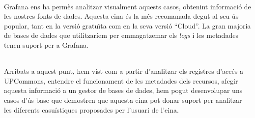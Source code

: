 \noindent \\
Grafana ens ha permès analitzar visualment aquests casos, obtenint informació de les nostres fonts de dades.
Aquesta eina és la més recomanada degut al seu ús popular, tant en la versió gratuïta com en la seva versió “Cloud”.
La gran majoria de bases de dades que utilitzaríem per emmagatzemar els \textit{\gls{log}s} i les metadades tenen suport per a Grafana.

\noindent \\
Arribats a aquest punt, hem vist com a partir d'analitzar els registres d'accés a \gls{UPCommons}, entendre el funcionament de les metadades dels recursos, afegir aquesta informació a un gestor de bases de dades, hem pogut desenvolupar uns casos d'ús base que demostren que aquesta eina pot donar suport per analitzar les diferents casuístiques proposades per l'usuari de l'eina.

